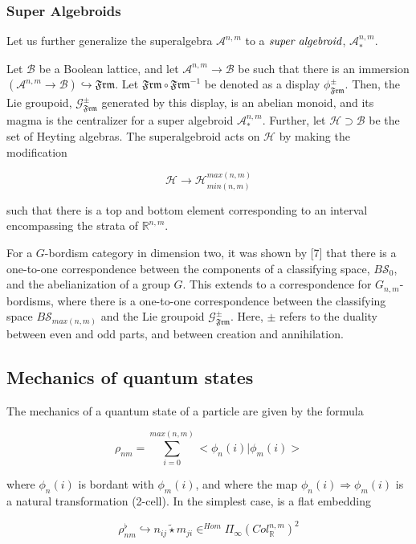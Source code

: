 \documentclass{article}
\begin{document}
	\subsubsection{Super Algebroids}
	Let us further generalize the superalgebra $\mathcal{A}^{n,m}$ to a $\emph{super algebroid}$, $\mathcal{A}_\ast^{n,m}$. 
	
	Let $\mathcal{B}$ be a Boolean lattice, and let $\mathcal{A}^{n,m} \longrightarrow \mathcal{B}$ be such that there is an immersion $(\mathcal{A}^{n,m} \longrightarrow \mathcal{B}) \hookrightarrow $$\mathfrak{Frm}$. Let $\mathfrak{Frm} \circ \mathfrak{Frm}^{-1}$ be denoted as a display $\phi_{\mathfrak{Frm}}^\pm$. Then, the Lie groupoid, $\mathcal{G}_\mathfrak{Frm}^\pm$ generated by this display, is an abelian monoid, and its magma is the centralizer for a super algebroid $\mathcal{A}_\ast^{n,m}$. Further, let $\mathcal{H} \supset \mathcal{B}$ be the set of Heyting algebras. The superalgebroid acts on $\mathcal{H}$ by making the modification
	
	$$\mathcal{H} \longrightarrow \mathcal{H}_{min(n,m)}^{max(n,m)}$$
	
	such that there is a top and bottom element corresponding to an interval encompassing the strata of $\mathbb{R}^{n,m}$.
	
	For a $G$-bordism category in dimension two, it was shown by [7] that there is a one-to-one correspondence between the components of a classifying space, $B\mathscr{S}_0$, and the abelianization of a group $G$. This extends to a correspondence for $G_{n,m}$-bordisms, where there is a one-to-one correspondence between the classifying space $B\mathscr{S}_{max(n,m)}$ and the Lie groupoid $\mathcal{G}_\mathfrak{Frm}^\pm$. Here, $\pm$ refers to the duality between even and odd parts, and between creation and annihilation. 
	
	\subsection{Mechanics of quantum states}
	
	The mechanics of a quantum state of a particle are given by the formula
	
	$$\rho_{nm} = \sum_{i=0}^{max(n,m)} <\phi_n(i)|\phi_m(i)>$$
	
	where $\phi_n(i)$ is bordant with $\phi_m(i)$, and where the map $\phi_n(i) \Rightarrow \phi_m(i)$ is a natural transformation (2-cell). In the simplest case, is a flat embedding
	
	$$\rho_{nm}^\flat \hookrightarrow n_{ij}\tilde{\star} m_{ji} \in^{Hom} \Pi_\infty (Col_\mathbb{R}^{n,m})^2$$
	
\end{document}
